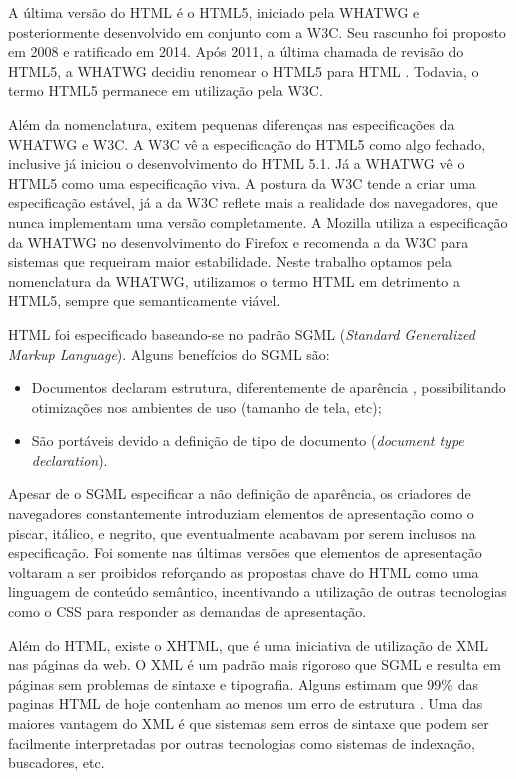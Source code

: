 A última versão do HTML é o HTML5, iniciado pela WHATWG e
posteriormente desenvolvido em conjunto com a W3C. Seu rascunho foi
proposto em 2008 e ratificado em 2014. Após 2011, a última chamada
de revisão do HTML5, a WHATWG decidiu renomear o HTML5 para HTML
\autocite{htmlIsTheNewHtml5}. Todavia, o termo HTML5 permanece em
utilização pela W3C.

Além da nomenclatura, exitem pequenas diferenças nas especificações
da WHATWG e W3C. A W3C vê a especificação do HTML5 como algo fechado,
inclusive já iniciou o desenvolvimento do HTML 5.1. Já a WHATWG vê o
HTML5 como uma especificação viva. A postura da W3C tende a criar uma
especificação estável, já a da W3C reflete mais a realidade dos
navegadores, que nunca implementam uma versão completamente. A Mozilla
utiliza a especificação da WHATWG no desenvolvimento do Firefox e
recomenda a da W3C para sistemas que requeiram maior estabilidade. Neste
trabalho optamos pela nomenclatura da WHATWG, utilizamos o termo HTML em
detrimento a HTML5, sempre que semanticamente viável.

HTML foi especificado baseando-se no padrão SGML (\textit{Standard Generalized
Markup Language}). Alguns benefícios do SGML são:

\begin{itemize}
    \item Documentos declaram estrutura, diferentemente de aparência
, possibilitando otimizações nos ambientes de uso (tamanho de tela,
etc);
    \item São portáveis devido a definição de tipo de documento
(\textit{document type declaration}).
\end{itemize}

Apesar de o SGML especificar a não definição de aparência, os criadores de
navegadores constantemente introduziam elementos de apresentação como o
piscar, itálico, e negrito, que eventualmente acabavam por serem inclusos
na especificação. Foi somente nas últimas versões que elementos de
apresentação voltaram a ser proibidos reforçando as propostas chave
do HTML como uma linguagem de conteúdo semântico, incentivando a
utilização de outras tecnologias como o CSS para responder as demandas de
apresentação.

Além do HTML, existe o XHTML, que é uma iniciativa de utilização de
XML nas páginas da web. O XML é um padrão mais rigoroso que SGML e
resulta em páginas sem problemas de sintaxe e tipografia. 
Alguns estimam que 99\% das paginas HTML de hoje
contenham ao menos um erro de estrutura \autocite{diveIntohtml}.
Uma das maiores vantagem do XML é que sistemas sem erros de sintaxe
que podem ser facilmente interpretadas por outras tecnologias como
sistemas de indexação, buscadores, etc.

